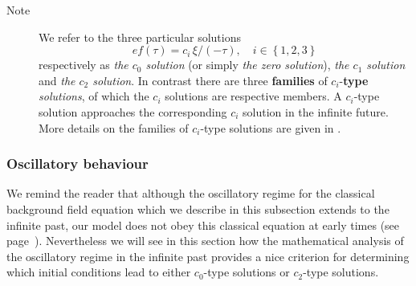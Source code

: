 \begin{description}
\item [{Note}] We refer to the three particular solutions 
\begin{equation}
ef(\tau)=c_{i}\,\xi/(-\tau),\quad i\in\left\{ 1,2,3\right\} \label{eq:ci-solutions-123}
\end{equation}
respectively as \emph{the $c_{0}$ solution} (or simply \emph{the zero solution}), \emph{the $c_{1}$ solution} and \emph{the $c_{2}$ solution}. In contrast there are three \textbf{families} of $c_{i}$\nobreakdash-\textbf{type} \emph{solutions}, of which the $c_{i}$ solutions are respective members. A $c_{i}$\nobreakdash-type solution approaches the corresponding $c_{i}$ solution in the infinite future. More details on the families of $c_{i}$\nobreakdash-type solutions are given in . 
\end{description}

\subsubsection*{Oscillatory behaviour}

We remind the reader that although the oscillatory regime for the classical background field equation  which we describe in this subsection extends to the infinite past, our model does not obey this classical equation at early times (see page~\pageref{ref:no-osc}). Nevertheless we will see in this section how the mathematical analysis of the oscillatory regime in the infinite past provides a nice criterion for determining which initial conditions lead to either $c_{0}$\nobreakdash-type solutions or $c_{2}$\nobreakdash-type solutions.

